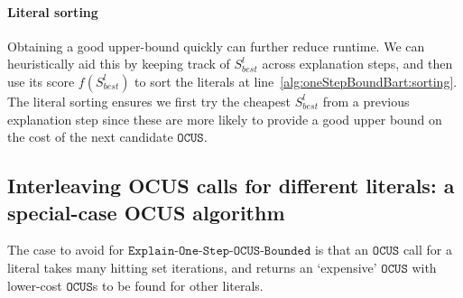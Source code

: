 \documentclass[twoside,11pt]{article}
\newcommand\m[1]{\mathcal{#1}}
\newcommand\comment[1]{\marginpar{\tiny #1}}
\renewcommand\comment[1]{#1}
\newcommand{\tias}[1]{{\comment{\color{blue}Tias:#1}}}
\newcommand{\emilio}[1]{{\comment{\color{red}Emilio: #1}}}
\newcommand\setstohit{\ensuremath{\m{H} }\xspace}
\newcommand\formula{\ensuremath{\m{F} }\xspace}
\newcommand\formulac{\ensuremath{\m{C} }\xspace}
\newcommand\mm[1]{\ensuremath{#1}\xspace}
\newcommand\call[1]{\mm{\texttt{#1}}}
\newcommand\omus{\mm{\call{OUS}}}
\newcommand\comus{\mm{\call{OCUS}}}
\newcommand\ousb{\mm{\call{OCUS\_Bound}}}
\newcommand\onestepomusbounded{\ensuremath{\call{Explain-One-Step-OCUS-Bounded}}\xspace}
\begin{document}
\paragraph{Literal sorting}  Obtaining a good upper-bound quickly can further reduce runtime. 
We can heuristically aid this by keeping track of $S^l_{best}$ across explanation steps, and then use its score $f(S^l_{best})$ to sort the literals at line~\ref{alg:oneStepBoundBart:sorting}. The literal sorting ensures we first try the cheapest $S^l_{best}$ from a previous explanation step since these are more likely to provide a good upper bound on the cost of the next candidate \comus.
%

\subsection{Interleaving OCUS calls for different literals: a special-case OCUS algorithm} 
The case to avoid for \onestepomusbounded{} is that an \comus call for a literal takes many hitting set iterations, and returns an `expensive' \comus with lower-cost \comus{s} to be found for other literals. 
\end{document}
